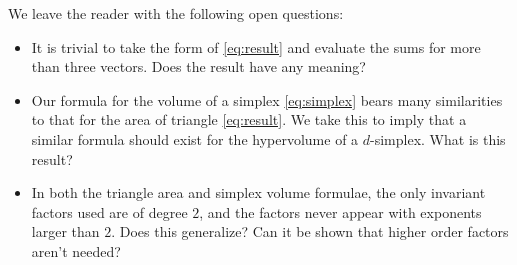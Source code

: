 \documentclass[12pt]{article}
\begin{document}
We leave the reader with the following open questions:
\begin{itemize}
    \item It is trivial to take the form of \eqref{eq:result} and evaluate the sums for more than three vectors. Does the result have any meaning?

    \item Our formula for the volume of a simplex \eqref{eq:simplex} bears many similarities to that for the area of triangle \eqref{eq:result}. We take this to imply that a similar formula should exist for the hypervolume of a $d$-simplex. What is this result?

    \item In both the triangle area and simplex volume formulae, the only invariant factors used are of degree $2$, and the factors never appear with exponents larger than $2$. Does this generalize? Can it be shown that higher order factors aren't needed?
\end{itemize}


\newpage
{\small\singlespacing}
\end{document}
